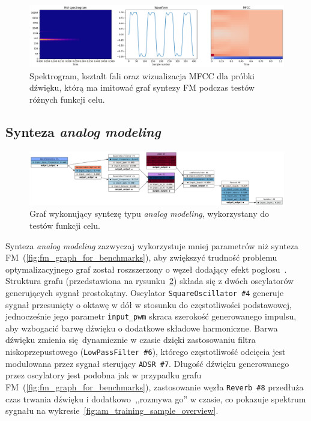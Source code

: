 \begin{figure}[H]
    \centering
    \includegraphics[width=1.0\linewidth]{rys03/fm_training_sample_overview.png}
    \caption{
      Spektrogram, kształt fali oraz wizualizacja MFCC dla próbki dźwięku, którą
      ma imitować graf syntezy FM podczas testów różnych funkcji celu.
    }\label{fig:fm_training_sample_overview}
\end{figure}


\subsection{Synteza \textit{analog modeling}}

\begin{figure}
    \centering
    \includegraphics[angle=90, width=0.30\linewidth]{rys03/analog_graph_for_benchmarks.png}
    \caption{
      Graf wykonujący syntezę typu \textit{analog modeling}, wykorzystany do testów funkcji celu.
    }\label{fig:analog_graph_for_benchmarks}
\end{figure}

Synteza \textit{analog modeling} zazwyczaj wykorzystuje mniej parametrów niż synteza
FM~(\ref{fig:fm_graph_for_benchmarks}), aby zwiększyć trudność problemu optymalizacyjnego
graf został roszszerzony o węzeł dodający efekt pogłosu~\cite{reverb}.
Struktura grafu (przedstawiona na rysunku~\ref{fig:analog_graph_for_benchmarks}) składa
się z dwóch oscylatorów generujących sygnał prostokątny. Oscylator \texttt{SquareOscillator \#4}
generuje sygnał przesunięty o oktawę w dół w stosunku do częstotliwości podstawowej, jednocześnie
jego parametr \texttt{input\_pwm} skraca szerokość generowanego impulsu, aby wzbogacić barwę dźwięku
o dodatkowe składowe harmoniczne. Barwa dźwięku zmienia się dynamicznie w czasie dzięki 
zastosowaniu filtra niskoprzepustowego (\texttt{LowPassFilter \#6}), którego
częstotliwość odcięcia jest modulowana przez sygnał sterujący \texttt{ADSR \#7}.
Długość dźwięku generowanego przez oscylatory jest podobna jak w przypadku
grafu FM~(\ref{fig:fm_graph_for_benchmarks}), zastosowanie węzła \texttt{Reverb \#8}
przedłuża czas trwania dźwięku i dodatkowo~,,rozmywa go'' w czasie, co pokazuje
spektrum sygnału na wykresie~\ref{fig:am_training_sample_overview}.

